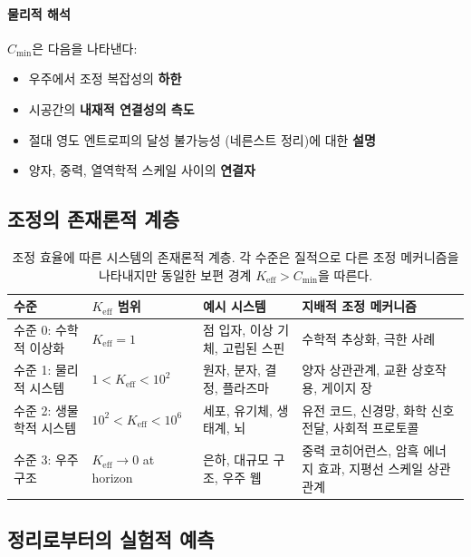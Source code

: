\documentclass[11pt,a4paper]{article}
\begin{document}
\paragraph{물리적 해석}
$C_{\min}$은 다음을 나타낸다:
\begin{itemize}
	\item 우주에서 조정 복잡성의 \textbf{하한}
	\item 시공간의 \textbf{내재적 연결성의 측도}
	\item 절대 영도 엔트로피의 달성 불가능성 (네른스트 정리)에 대한 \textbf{설명}
	\item 양자, 중력, 열역학적 스케일 사이의 \textbf{연결자}
\end{itemize}

\subsection{조정의 존재론적 계층}

\begin{table}[htbp]
	\centering
	\small
	\begin{tabular}{|p{}|p{}|p{}|p{}|}
		\hline
		\textbf{수준} & \textbf{$K_{\mathrm{eff}}$ 범위} & \textbf{예시 시스템} & \textbf{지배적 조정 메커니즘} \\
		\hline
		수준 0: 수학적 이상화 & $K_{\mathrm{eff}} = 1$ & 점 입자, 이상 기체, 고립된 스핀 & 수학적 추상화, 극한 사례 \\
		\hline
		수준 1: 물리적 시스템 & $1 < K_{\mathrm{eff}} < 10^2$ & 원자, 분자, 결정, 플라즈마 & 양자 상관관계, 교환 상호작용, 게이지 장 \\
		\hline
		수준 2: 생물학적 시스템 & $10^2 < K_{\mathrm{eff}} < 10^6$ & 세포, 유기체, 생태계, 뇌 & 유전 코드, 신경망, 화학 신호전달, 사회적 프로토콜 \\
		\hline
		수준 3: 우주 구조 & $K_{\mathrm{eff}} \to 0$ at horizon & 은하, 대규모 구조, 우주 웹 & 중력 코히어런스, 암흑 에너지 효과, 지평선 스케일 상관관계 \\
		\hline
	\end{tabular}
	\caption{조정 효율에 따른 시스템의 존재론적 계층. 각 수준은 질적으로 다른 조정 메커니즘을 나타내지만 동일한 보편 경계 $K_{\mathrm{eff}} > C_{\min}$을 따른다.}
	\label{tab:ontology-hierarchy}
\end{table}

\subsection{정리로부터의 실험적 예측}
\end{document}
